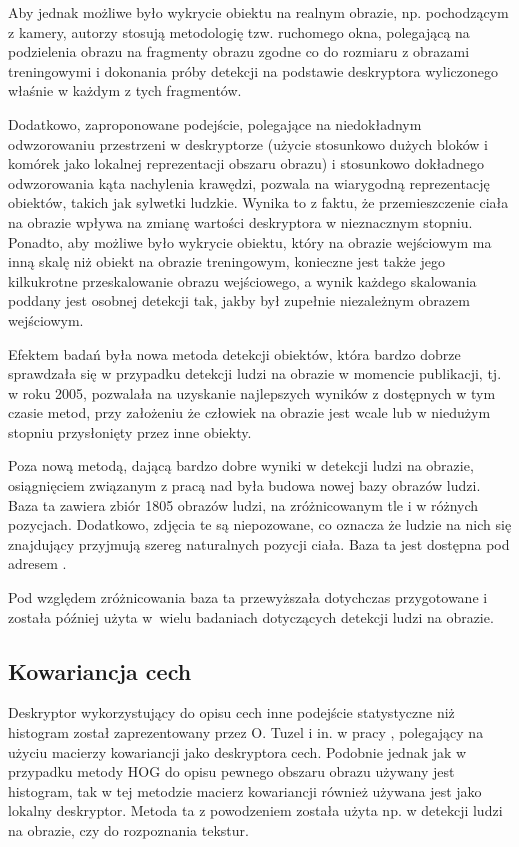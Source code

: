 Aby jednak możliwe było wykrycie obiektu na realnym obrazie, np. pochodzącym z kamery, autorzy stosują metodologię tzw. ruchomego okna, polegającą na podzielenia obrazu na fragmenty obrazu zgodne co do rozmiaru z obrazami treningowymi i dokonania próby detekcji na podstawie deskryptora wyliczonego właśnie w każdym z tych fragmentów.

Dodatkowo, zaproponowane podejście, polegające na niedokładnym odwzorowaniu przestrzeni w deskryptorze (użycie stosunkowo dużych bloków i komórek jako lokalnej reprezentacji obszaru obrazu) i stosunkowo dokładnego odwzorowania kąta nachylenia krawędzi, pozwala na wiarygodną reprezentację obiektów, takich jak sylwetki ludzkie. Wynika to z faktu, że przemieszczenie ciała na obrazie wpływa na zmianę wartości deskryptora w nieznacznym stopniu. Ponadto, aby możliwe było wykrycie obiektu, który na obrazie wejściowym ma inną skalę niż obiekt na obrazie treningowym, konieczne jest także jego kilkukrotne przeskalowanie obrazu wejściowego, a wynik każdego skalowania poddany jest osobnej detekcji tak, jakby był zupełnie niezależnym obrazem wejściowym.

Efektem badań była nowa metoda detekcji obiektów, która bardzo dobrze sprawdzała się w przypadku detekcji ludzi na obrazie w momencie publikacji, tj. w roku 2005, pozwalała na uzyskanie najlepszych wyników z dostępnych w tym czasie metod, przy założeniu że człowiek na obrazie jest wcale lub w niedużym stopniu przysłonięty przez inne obiekty.

Poza nową metodą, dającą bardzo dobre wyniki w detekcji ludzi na obrazie, osiągnięciem związanym z pracą nad \cite{Dalal05} była budowa nowej bazy obrazów ludzi. Baza ta zawiera zbiór 1805 obrazów ludzi, na zróżnicowanym tle i w różnych pozycjach. Dodatkowo, zdjęcia te są niepozowane, co oznacza że ludzie na nich się znajdujący przyjmują szereg naturalnych pozycji ciała. Baza ta jest dostępna pod adresem \cite{INRIA_set}.

Pod względem zróżnicowania baza ta przewyższała dotychczas przygotowane i została później użyta w~wielu badaniach dotyczących detekcji ludzi na obrazie.

\subsection{Kowariancja cech}
Deskryptor wykorzystujący do opisu cech inne podejście statystyczne niż histogram został zaprezentowany przez O. Tuzel i in. w pracy \cite{Tuzel06}, polegający na użyciu macierzy kowariancji jako deskryptora cech. Podobnie jednak jak w przypadku metody HOG do opisu pewnego obszaru obrazu używany jest histogram, tak w tej metodzie macierz kowariancji również używana jest jako lokalny deskryptor. Metoda ta z powodzeniem została użyta np. w detekcji ludzi na obrazie, czy do rozpoznania tekstur.

